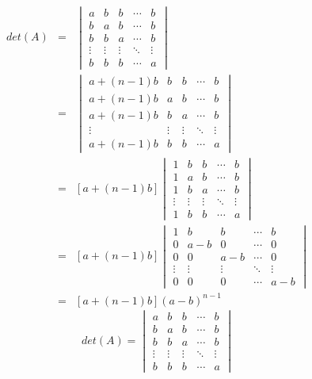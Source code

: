 \begin{proposition}
	\begin{eqnarray*}
		det(A) & = & 
			\begin{vmatrix}
				a      & b      & b      & \cdots & b\\
				b      & a      & b      & \cdots & b\\
				b      & b      & a      & \cdots & b\\
				\vdots & \vdots & \vdots & \ddots & \vdots\\
				b      & b      & b      & \cdots & a
			\end{vmatrix}\\
			   & = & 
			\begin{vmatrix}
				a+(n-1)b & b      & b      & \cdots & b\\
				a+(n-1)b & a      & b      & \cdots & b\\
				a+(n-1)b & b      & a      & \cdots & b\\
				\vdots   & \vdots & \vdots & \ddots & \vdots\\
				a+(n-1)b & b      & b      & \cdots & a
			\end{vmatrix}\\
			   & = & [a+(n-1)b]
			\begin{vmatrix}
				1      & b      & b      & \cdots & b\\
				1      & a      & b      & \cdots & b\\
				1      & b      & a      & \cdots & b\\
				\vdots & \vdots & \vdots & \ddots & \vdots\\
				1      & b      & b      & \cdots & a
			\end{vmatrix}\\
			   & = & [a+(n-1)b]
			\begin{vmatrix}
				1      & b      & b      & \cdots & b\\
				0      & a-b    & 0      & \cdots & 0\\
				0      & 0      & a-b    & \cdots & 0\\
				\vdots & \vdots & \vdots & \ddots & \vdots\\
				0      & 0      & 0      & \cdots & a-b
			\end{vmatrix}\\
			   & = & [a+(n-1)b](a-b)^{n-1}
	\end{eqnarray*}
	$$det(A) = \begin{vmatrix}
		a      & b      & b      & \cdots & b\\
		b      & a      & b      & \cdots & b\\
		b      & b      & a      & \cdots & b\\
		\vdots & \vdots & \vdots & \ddots & \vdots\\
		b      & b      & b      & \cdots & a
	\end{vmatrix}$$

\end{proposition}


